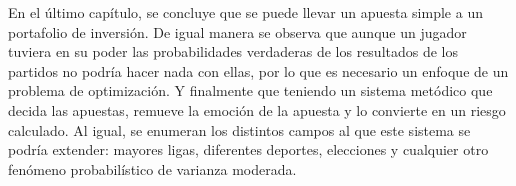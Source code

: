En el último capítulo, se concluye que se puede llevar un apuesta simple a un portafolio de inversión. De igual manera se observa que aunque un jugador tuviera en su poder las probabilidades verdaderas de los resultados de los partidos no podría hacer nada con ellas, por lo que es necesario un enfoque de un problema de optimización. Y finalmente que teniendo un sistema metódico que decida las apuestas, remueve la emoción de la apuesta y lo convierte en un riesgo calculado. Al igual, se enumeran los distintos campos al que este sistema se podría extender: mayores ligas, diferentes deportes, elecciones y cualquier otro fenómeno probabilístico de varianza moderada.

